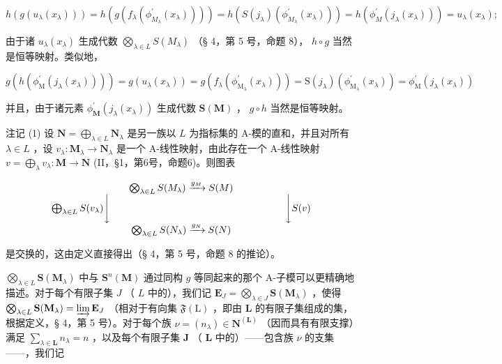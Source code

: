 \[
h \left(g \left(u _ {\lambda} \left(x _ {\lambda}\right)\right)\right) = h \left(g \left(f _ {\lambda} \left(\phi_ {M _ {\lambda}} ^ {\prime} \left(x _ {\lambda}\right)\right)\right)\right) = h \left(S \left(j _ {\lambda}\right) \left(\phi_ {M _ {\lambda}} ^ {\prime} \left(x _ {\lambda}\right)\right)\right) = h \left(\phi_ {M} ^ {\prime} \left(j _ {\lambda} \left(x _ {\lambda}\right)\right)\right) = u _ {\lambda} \left(x _ {\lambda}\right);
\]

由于诸 \(u_{\lambda}(x_{\lambda})\) 生成代数 \(\bigotimes_{\lambda \in L} S(M_{\lambda})\) （§ 4，第 5 号，命题 8）， \(h \circ g\) 当然是恒等映射。类似地，

\[
g \left(h \left(\phi_ {\mathrm{M}} ^ {\prime} \left(j _ {\lambda} \left(x _ {\lambda}\right)\right)\right)\right) = g \left(u _ {\lambda} \left(x _ {\lambda}\right)\right) = g \left(f _ {\lambda} \left(\phi_ {\mathrm{M} _ {\lambda}} ^ {\prime} \left(x _ {\lambda}\right)\right)\right) = \mathrm{S} \left(j _ {\lambda}\right) \left(\phi_ {\mathrm{M} _ {\lambda}} ^ {\prime} \left(x _ {\lambda}\right)\right) = \phi_ {\mathrm{M}} ^ {\prime} \left(j _ {\lambda} \left(x _ {\lambda}\right)\right)
\]

并且，由于诸元素 \(\phi_{\mathbf{M}}^{\prime}(j_{\lambda}(x_{\lambda}))\) 生成代数 \(\mathbf{S}(\mathbf{M})\) ， \(g \circ h\) 当然是恒等映射。

注记 (1) 设 \(\mathbf{N} = \bigoplus_{\lambda \in L} \mathbf{N}_{\lambda}\) 是另一族以 \(L\) 为指标集的 A-模的直和，并且对所有 \(\lambda \in L\) ，设 \(v_{\lambda}: \mathbf{M}_{\lambda} \to \mathbf{N}_{\lambda}\) 是一个 A-线性映射，由此存在一个 A-线性映射 \(v = \bigoplus_{\lambda} v_{\lambda}: \mathbf{M} \to \mathbf{N}\) (II，§1，第6号，命题6)。则图表

\[
\begin{array}{c} \bigotimes_ {\lambda \in L} S (M _ {\lambda}) \xrightarrow {g _ {M}} S (M) \\ \bigoplus_ {\lambda \in L} S (v _ {\lambda}) \Biggl \downarrow \qquad \qquad \qquad \qquad \qquad \qquad \qquad \qquad \qquad \Biggl \downarrow S (v) \\ \bigotimes_ {\lambda \in L} S (N _ {\lambda}) \xrightarrow {g _ {N}} S (N) \end{array}
\]

是交换的，这由定义直接得出（§ 4，第 5 号，命题 8 的推论）。

\(\bigotimes_{\lambda \in L} \mathbf{S}(\mathbf{M}_{\lambda})\) 中与 \(\mathbf{S}^n(\mathbf{M})\) 通过同构 \(g\) 等同起来的那个 A-子模可以更精确地描述。对于每个有限子集 \(J\) （ \(L\) 中的），我们记 \(\mathbf{E}_J = \bigotimes_{\lambda \in J} \mathbf{S}(\mathbf{M}_{\lambda})\) ，使得 \(\bigotimes_{\lambda \in L} \mathbf{S}(\mathbf{M}_{\lambda}) = \varinjlim \mathbf{E}_J\) （相对于有向集 \(\mathfrak{F}(\mathrm{L})\) ，即由 \(\mathbf{L}\) 的有限子集组成的集，根据定义，§ 4，第 5 号）。对于每个族 \(\nu = (n_{\lambda}) \in \mathbf{N}^{(\mathbf{L})}\) （因而具有有限支撑）满足 \(\sum_{\lambda \in \mathbf{L}} n_{\lambda} = n\) ，以及每个有限子集 \(\mathbf{J}\) （ \(\mathbf{L}\) 中的）——包含族 \(\nu\) 的支集——，我们记

